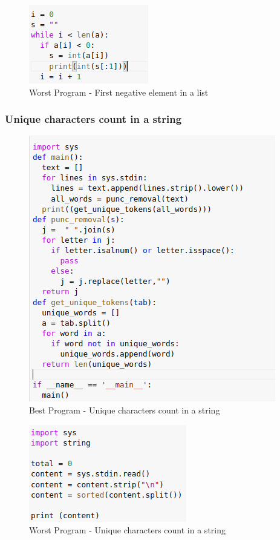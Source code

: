\begin{figure}[h]
\centering
\includegraphics[]{./figures/worst_fn.png}
\caption{Worst Program - First negative element in a list}
\label{fig1}
\end{figure}

\newpage

\subsubsection{Unique characters count in a string}

\begin{figure}[h]
\centering
\includegraphics[]{./figures/best_uc.png}
\caption{Best Program - Unique characters count in a string}
\label{fig1}
\end{figure}

\begin{figure}[h]
\centering
\includegraphics[]{./figures/worst_uc.png}
\caption{Worst Program - Unique characters count in a string}
\label{fig1}
\end{figure}

